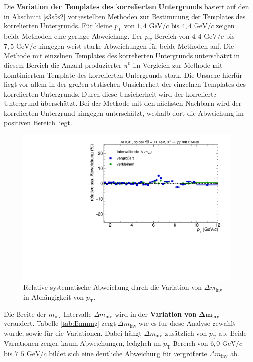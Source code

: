 \newline
Die \textbf{Variation der Templates des korrelierten Untergrunds} basiert auf den in Abschnitt \ref{s3s5s2} vorgestellten Methoden zur Bestimmung der Templates des korrelierten Untergrunds.
Für kleine $p_\text{T}$ von $1,4 \text{ GeV}/c$ bis $4,4 \text{ GeV}/c$ zeigen beide Methoden eine geringe Abweichung.
Der $p_\text{T}$-Bereich von $4,4 \text{ GeV}/c$ bis $7,5 \text{ GeV}/c$ hingegen weist starke Abweichungen für beide Methoden auf.
Die Methode mit einzelnen Templates des korrelierten Untergrunds unterschätzt in diesem Bereich die Anzahl produzierter $\pi^{0}$ im Vergleich zur Methode mit kombiniertem Template des korrelierten Untergrunds stark.
Die Ursache hierfür liegt vor allem in der großen statischen Unsicherheit der einzelnen Templates des korrelierten Untergrunds.
Durch diese Unsicherheit wird der korrelierte Untergrund überschätzt.
Bei der Methode mit den nächsten Nachbarn wird der korrelierten Untergrund hingegen unterschätzt, weshalb dort die Abweichung im positiven Bereich liegt.
\begin{figure}[t!]
\centering
\includegraphics[width=.65\linewidth]{YieldsSysUncerRebinning_Data_2016.pdf}
\caption{Relative systematische Abweichung durch die Variation von $\Delta m_\text{inv}$ in Abhängigkeit von $p_\text{T}$.}
\label{fig:BinningSys}
\end{figure}
\newline
Die Breite der $m_\text{inv}$-Intervalle $\Delta m_\text{inv}$ wird in der \textbf{Variation von} $\boldsymbol{\Delta m}_\textbf{inv}$ verändert.
Tabelle \ref{tab:Binning} zeigt $\Delta m_\text{inv}$ wie es für diese Analyse gewählt wurde, sowie für die Variationen.
Dabei hängt $\Delta m_\text{inv}$ zusätzlich von $p_\text{T}$ ab.
\newline
Beide Variationen zeigen kaum Abweichungen, lediglich im $p_\text{T}$-Bereich von $6,0 \text{ GeV}/c$ bis $7,5 \text{ GeV}/c$ bildet sich eine deutliche Abweichung für vergrößerte $\Delta m_\text{inv}$ ab.
